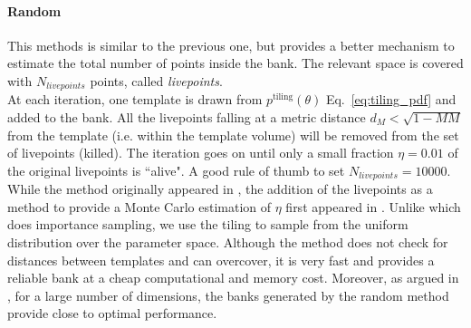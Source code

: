 \documentclass[twocolumn,showpacs,preprintnumbers,nofootinbib,prd,
superscriptaddress,10pt]{revtex4-2}
\begin{document}
\paragraph{Random}\label{par:random}
This methods is similar to the previous one, but provides a better mechanism to estimate the total number of points inside the bank.
The relevant space is covered with $N_{livepoints}$ points, called {\it livepoints}.
\\
At each iteration, one template is drawn from $p^{\text{tiling}}(\theta)$ Eq.~\eqref{eq:tiling_pdf} and added to the bank. All the livepoints falling at a metric distance $d_M<\sqrt{1-MM}$ from the template (i.e. within the template volume) will be removed from the set of livepoints (killed). The iteration goes on until only a small fraction $\eta = 0.01$ of the original livepoints is ``alive". A good rule of thumb to set $N_{livepoints} = 10000$.
\\
While the method originally appeared in \cite{Messenger:2008ta}, the addition of the livepoints as a method to provide a Monte Carlo estimation of $\eta$ first appeared in \cite{Coogan:2022qxs}. Unlike \cite{Coogan:2022qxs} which does importance sampling, we use the tiling to sample from the uniform distribution over the parameter space.
Although the method does not check for distances between templates and can overcover, it is very fast and provides a reliable bank at a cheap computational and memory cost.
Moreover, as argued in \cite{Messenger:2008ta, Allen:2021yuy, Allen:2022lqr}, for a large number of dimensions, the banks generated by the random method provide close to optimal performance.

\end{document}
